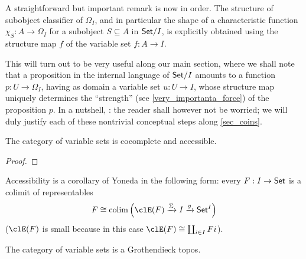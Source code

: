 \begin{remark}
	A straightforward but important remark is now in order. The structure of subobject classifier of $\Omega_I$, and in particular the shape of a characteristic function $\chi_S : A \to \Omega_I$ for a subobject $S\subseteq A$ in $\mathsf{Set}/I$, is explicitly obtained using the structure map $f$ of the variable set $f : A\to I$.

	This will turn out to be very useful along our main section, where we shall note that a proposition in the internal language of $\mathsf{Set}/I$ amounts to a function $p : U \to \Omega_I$, having as domain a variable set $u : U \to I$, whose structure map uniquely determines the ``strength'' (see \autoref{very_importanta_force}) of the proposition $p$. In a nutshell, : the reader shall however not be worried; we will duly justify each of these nontrivial conceptual steps along \autoref{sec_coins}.
\end{remark}
\begin{proposition}
	The category of variable sets is cocomplete and accessible.
\end{proposition}
\begin{proof}

\end{proof}
Accessibility is a corollary of Yoneda in the following form: every $F : I \to \mathsf{Set}$ is a colimit of representables
\[
	F \cong \colim\Big(\clE(F) \xto{\Sigma} I \xto{y} \Set^I\Big)
\]
($\clE(F)$ is small because in this case $\clE(F)\cong\coprod_{i\in I}Fi$).
\begin{corollary}
	The category of variable sets is a Grothendieck topos.
\end{corollary}
